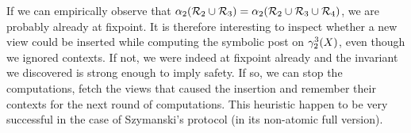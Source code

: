 If we can empirically observe that $\alpha_{2}(\mathcal{R}_{2} \cup
  \mathcal{R}_{3}) = \alpha_{2}(\mathcal{R}_{2} \cup \mathcal{R}_{3} \cup
  \mathcal{R}_{4})$, we are probably already at fixpoint. It is therefore
interesting to inspect whether a new view could be inserted while
computing the symbolic post on $\gamma_{2}^{3}(X)$, even though
we ignored contexts.
%
If not, we were indeed at fixpoint already and the invariant we
discovered is strong enough to imply safety.
% 
If so, we can stop the computations, fetch the views that caused the
insertion and remember their contexts for the next round of
computations.
%
This heuristic happen to be very successful in the case of Szymanski's
protocol (in its non-atomic full version).

